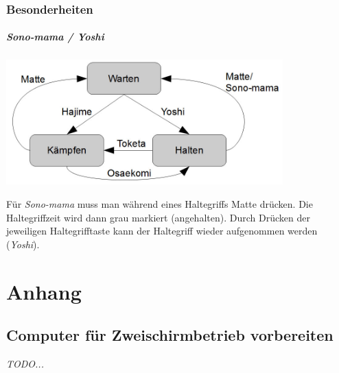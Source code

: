 \documentclass[ngerman,12pt,numbers=noenddot]{scrreprt}
\begin{document}
{\subsection[Besonderheiten]{Besonderheiten}
\paragraph{Sono-mama / Yoshi}
\begin{center}
\includegraphics[width=0.80\textwidth]{Anleitung-img004.jpg}
\end{center}
F\"ur \textit{Sono-mama} muss man
w\"ahrend eines Haltegriffs Matte dr\"ucken. Die Haltegriffzeit wird
dann grau markiert (angehalten). Durch Dr\"ucken der jeweiligen
Haltegrifftaste kann der Haltegriff wieder aufgenommen werden
(\textit{Yoshi}).}

\clearpage
\chapter{Anhang}
\section[Computer f\"ur Zweischirmbetrieb vorbereiten]{Computer f\"ur Zweischirmbetrieb vorbereiten}
\label{bkm:AnhangDualView}\label{bkm:RefNumPara3241634018798}{\itshape
TODO...}
\end{document}
